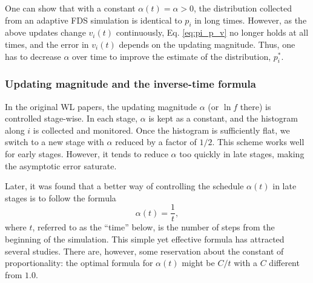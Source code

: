 \documentclass[reprint, floatfix]{revtex4-1}
\begin{document}
One can show that with a constant $\alpha(t) = \alpha > 0$,
the distribution collected from
an adaptive FDS simulation
is identical to $p_i$ in long times.
%
However, as the above updates
change $v_i(t)$ continuously,
Eq. \eqref{eq:pi_p_v} no longer holds
at all times,
and the error in $v_i(t)$
depends on the updating magnitude\cite{
  zhou2005, liang2005, laio2005, bussi2006, poulain2006, liang2007,
  morozov2007, zhou2008, morozov2009, crespo2010,
  atchade2011, fort2015}.
%
Thus, one has to decrease $\alpha$ over time
to improve the estimate of the distribution,
$p^*_i$. %





\subsubsection{Updating magnitude and the inverse-time formula}



In the original WL papers\cite{
wang2001, wang2001pre},
the updating magnitude $\alpha$
(or $\ln f$ there)
is controlled stage-wise.
%
In each stage, $\alpha$
is kept as a constant,
and the histogram along $i$
is collected and monitored.
%
Once the histogram is sufficiently flat,
we switch to a new stage
with $\alpha$ reduced by a factor of $1/2$\cite{
wang2001, wang2001pre}.
%
This scheme works well for early stages.
%
However, it tends to reduce $\alpha$
too quickly in late stages, making the asymptotic error
saturate\cite{belardinelli2007, belardinelli2007jcp, belardinelli2008}.


Later,
it was found that
a better way
of controlling the schedule $\alpha(t)$
in late stages
is to follow the formula
%
\begin{equation}
  \alpha(t) = \frac{1}{t},
  \label{eq:alpha_invt}
\end{equation}
%
where $t$,
referred to as the ``time'' below,
is the number of steps
from the beginning of the simulation.
%
This simple yet effective formula has attracted
several studies\cite{belardinelli2007, belardinelli2007jcp, belardinelli2008,
morozov2007, zhou2008, morozov2009,
komura2012, caparica2012, caparica2014}.
%
There are, however, some reservation about
the constant of proportionality:
the optimal formula for $\alpha(t)$
might be $C/t$ with a $C$
different from $1.0$\cite{
morozov2007, zhou2008, morozov2009}.
\end{document}
